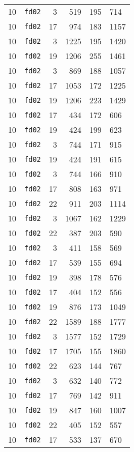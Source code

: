 \documentclass{article}
\begin{document}
\begin{table}[h!]
\begin{tabular}{llrrrl}
    10 & \texttt{fd02} & 3 & 519 & 195 & 714 \\
    10 & \texttt{fd02} & 17 & 974 & 183 & 1157 \\
    10 & \texttt{fd02} & 3 & 1225 & 195 & 1420 \\
    10 & \texttt{fd02} & 19 & 1206 & 255 & 1461 \\
    10 & \texttt{fd02} & 3 & 869 & 188 & 1057 \\
    10 & \texttt{fd02} & 17 & 1053 & 172 & 1225 \\
    10 & \texttt{fd02} & 19 & 1206 & 223 & 1429 \\
    10 & \texttt{fd02} & 17 & 434 & 172 & 606 \\
    10 & \texttt{fd02} & 19 & 424 & 199 & 623 \\
    10 & \texttt{fd02} & 3 & 744 & 171 & 915 \\
    10 & \texttt{fd02} & 19 & 424 & 191 & 615 \\
    10 & \texttt{fd02} & 3 & 744 & 166 & 910 \\
    10 & \texttt{fd02} & 17 & 808 & 163 & 971 \\
    10 & \texttt{fd02} & 22 & 911 & 203 & 1114 \\
    10 & \texttt{fd02} & 3 & 1067 & 162 & 1229 \\
    10 & \texttt{fd02} & 22 & 387 & 203 & 590 \\
    10 & \texttt{fd02} & 3 & 411 & 158 & 569 \\
    10 & \texttt{fd02} & 17 & 539 & 155 & 694 \\
    10 & \texttt{fd02} & 19 & 398 & 178 & 576 \\
    10 & \texttt{fd02} & 17 & 404 & 152 & 556 \\
    10 & \texttt{fd02} & 19 & 876 & 173 & 1049 \\
    10 & \texttt{fd02} & 22 & 1589 & 188 & 1777 \\
    10 & \texttt{fd02} & 3 & 1577 & 152 & 1729 \\
    10 & \texttt{fd02} & 17 & 1705 & 155 & 1860 \\
    10 & \texttt{fd02} & 22 & 623 & 144 & 767 \\
    10 & \texttt{fd02} & 3 & 632 & 140 & 772 \\
    10 & \texttt{fd02} & 17 & 769 & 142 & 911 \\
    10 & \texttt{fd02} & 19 & 847 & 160 & 1007 \\
    10 & \texttt{fd02} & 22 & 405 & 152 & 557 \\
    10 & \texttt{fd02} & 17 & 533 & 137 & 670 \\

\end{tabular}
\end{table}
\end{document}
